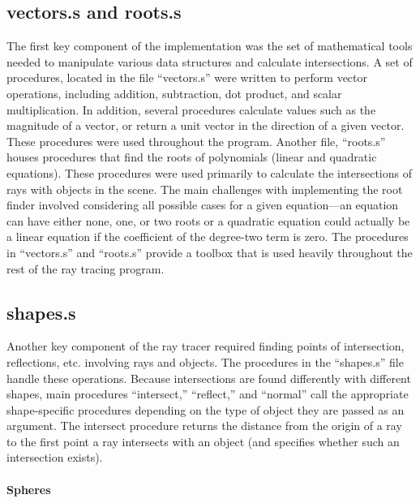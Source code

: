 \documentclass[10pt]{article}
\begin{document}
\subsection{vectors.s and roots.s}

The first key component of the implementation was the set of
mathematical tools needed to manipulate various data structures and
calculate intersections. A set of procedures, located in the file
``vectors.s'' were written to perform vector operations, including
addition, subtraction, dot product, and scalar multiplication. In
addition, several procedures calculate values such as the magnitude
of a vector, or return a unit vector in the direction of a given
vector. These procedures were used throughout the program. Another
file, ``roots.s'' houses procedures that find the roots of polynomials
(linear and quadratic equations). These procedures were used primarily
to calculate the intersections of rays with objects in the scene. The
main challenges with implementing the root finder involved considering
all possible cases for a given equation—an equation can have either
none, one, or two roots or a quadratic equation could actually be a
linear equation if the coefficient of the degree-two term is zero. The
procedures in ``vectors.s'' and ``roots.s'' provide a toolbox that is
used heavily throughout the rest of the ray tracing program.

\subsection{shapes.s}

Another key component of the ray tracer required finding points of
intersection, reflections, etc. involving rays and objects. The
procedures in the ``shapes.s'' file handle these operations.
Because intersections are found differently with different shapes,
main procedures ``intersect,'' ``reflect,'' and ``normal'' call
the appropriate shape-specific procedures depending on the type
of object they are passed as an argument. The intersect procedure
returns the distance from the origin of a ray to the first point a ray
intersects with an object (and specifies whether such an intersection
exists).

\paragraph{Spheres}
\end{document}
